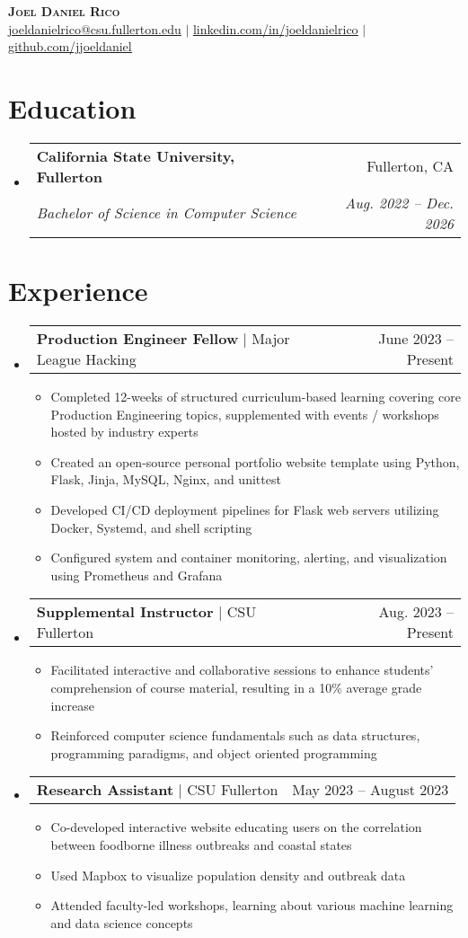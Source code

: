 \documentclass[letterpaper,11pt]{article}
\makeatletter
\newcommand{\resumeItem}[1]{
  \item\small{
    {#1 \vspace{-2pt}}
  }
}
\newcommand{\resumeSubheading}[4]{
  \vspace{-2pt}\item
    \begin{tabular*}{0.97\textwidth}[t]{l@{\extracolsep{\fill}}r}
      \textbf{#1} & #2 \\
      \textit{\small#3} & \textit{\small #4} \\
    \end{tabular*}\vspace{-7pt}
}
\newcommand{\resumeProjectHeading}[2]{
    \item
    \begin{tabular*}{0.97\textwidth}{l@{\extracolsep{\fill}}r}
      \small#1 & #2 \\
    \end{tabular*}\vspace{-7pt}
}
\newcommand{\resumeSubHeadingListStart}{\begin{itemize}[leftmargin=0.15in, label={}]}
\newcommand{\resumeSubHeadingListEnd}{\end{itemize}}
\newcommand{\resumeItemListStart}{\begin{itemize}}
\newcommand{\resumeItemListEnd}{\end{itemize}\vspace{-5pt}}
\makeatother
\begin{document}
\begin{center}
    \textbf{\Huge \scshape Joel Daniel Rico} \\ \vspace{1pt}
    \small \href{mailto:joeldanielrico@csu.fullerton.edu.com}{\underline{joeldanielrico@csu.fullerton.edu}} $|$ 
    \href{https://linkedin.com/in/joeldanielrico}{\underline{linkedin.com/in/joeldanielrico}} $|$
    \href{https://github.com/jjoeldaniel}{\underline{github.com/jjoeldaniel }}
\end{center}

\section{Education}
  \resumeSubHeadingListStart
    \resumeSubheading
      {California State University, Fullerton}{Fullerton, CA}
      {Bachelor of Science in Computer Science}{Aug. 2022 -- Dec. 2026}
  \resumeSubHeadingListEnd

\section{Experience}
  \resumeSubHeadingListStart
    \resumeProjectHeading
          {\textbf{Production Engineer Fellow} $|$ {Major League Hacking}}{June 2023 -- Present}
          \resumeItemListStart
            \resumeItem{Completed 12-weeks of structured curriculum-based learning covering core Production Engineering topics, supplemented with events / workshops hosted by industry experts}
            \resumeItem{Created an open-source personal portfolio website template using Python, Flask, Jinja, MySQL, Nginx, and unittest}
            \resumeItem{Developed CI/CD deployment pipelines for Flask web servers utilizing Docker, Systemd, and shell scripting}
            \resumeItem{Configured system and container monitoring, alerting, and visualization using Prometheus and Grafana}
          \resumeItemListEnd
    \resumeProjectHeading
          {\textbf{Supplemental Instructor} $|$ {CSU Fullerton}}{Aug. 2023 -- Present}
          \resumeItemListStart
            \resumeItem{Facilitated interactive and collaborative sessions to enhance students' comprehension of course material, resulting in a 10\% average grade increase}
            \resumeItem{Reinforced computer science fundamentals such as data structures, programming paradigms, and object oriented programming}
          \resumeItemListEnd
    \resumeProjectHeading
          {\textbf{Research Assistant} $|$ {CSU Fullerton}}{May 2023 -- August 2023}
          \resumeItemListStart
            \resumeItem{Co-developed interactive website educating users on the correlation between foodborne illness outbreaks and coastal states}
            \resumeItem{Used Mapbox to visualize population density and outbreak data}
            \resumeItem{Attended faculty-led workshops, learning about various machine learning and data science concepts}
          \resumeItemListEnd
  \resumeSubHeadingListEnd
\end{document}
